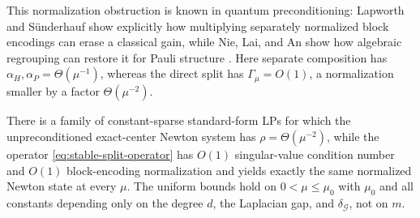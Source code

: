 This normalization obstruction is known in quantum preconditioning:
Lapworth and S\"underhauf show explicitly how multiplying separately
normalized block encodings can erase a classical gain, while Nie, Lai, and
An show how algebraic regrouping can restore it for Pauli structure
\cite{leigh2025-preconditioned-block-encodings-quantum-linear,hantao2026-pauli-structured-preconditioning-quantum-linear}.
Here separate composition has $\alpha_H,\alpha_P=\Theta(\mu^{-1})$, whereas
the direct split has $\Gamma_\mu=O(1)$, a normalization smaller by a factor
$\Theta(\mu^{-2})$.

\begin{proposition}
\label{prop:stable-expander-witness}
There is a family of constant-sparse standard-form LPs for which the
unpreconditioned exact-center Newton system has $\rho=\Theta(\mu^{-2})$,
while the operator \eqref{eq:stable-split-operator} has $O(1)$
singular-value condition number and $O(1)$ block-encoding normalization and
yields exactly the same normalized Newton state at every $\mu$.  The
uniform bounds hold on
$0<\mu\leq\mu_0$ with $\mu_0$ and all constants depending only on the degree
$d$, the Laplacian gap, and $\delta_{\mathcal G}$, not on $m$.
\end{proposition}

